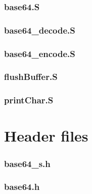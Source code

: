 \subsubsection{base64.S}\label{app_base64}

\clearpage

\subsubsection{base64\_decode.S}\label{app_base64_decode}

\clearpage

\subsubsection{base64\_encode.S}\label{app_base64_encode}

\clearpage

\subsubsection{flushBuffer.S}\label{app_flushBuffer}

\clearpage

\subsubsection{printChar.S}\label{app_printChar}

\clearpage

\clearpage
\section{Header files}\label{appendix_headers}

\subsubsection{base64\_s.h}\label{app_base64_s_h}

\clearpage

\subsubsection{base64.h}\label{app_base64_h}

\clearpage


